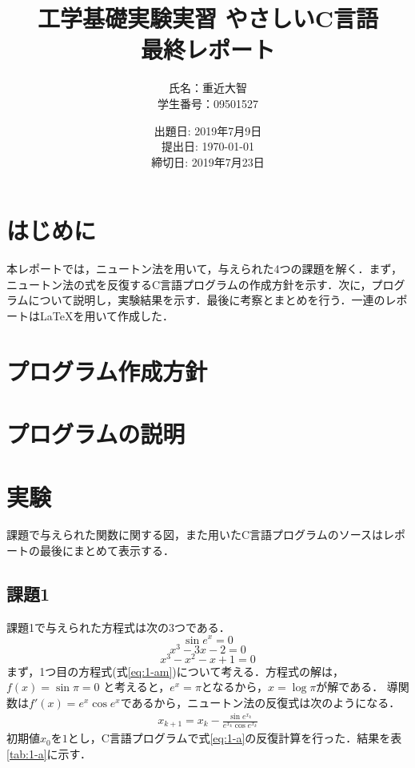 \documentclass[12pt]{jarticle}
\renewcommand  \[  {\begin{eqnarray}}
\renewcommand  \]  {\end{eqnarray}}
\begin{document}
\title{工学基礎実験実習 やさしいC言語\\最終レポート}%
\date{出題日: 2019年7月9日 \\
      提出日: \today \\
      締切日: 2019年7月23日 \\} 
\author{氏名：重近大智\\学生番号：09501527}
\maketitle

\section{はじめに}
本レポートでは，ニュートン法を用いて，与えられた4つの課題を解く．まず，ニュートン法の式を反復するC言語プログラムの作成方針を示す．次に，プログラムについて説明し，実験結果を示す．最後に考察とまとめを行う．一連のレポートは\LaTeX{}を用いて作成した．

\section{プログラム作成方針}


\section{プログラムの説明}

\section{実験}
\label{sec:exp}
課題で与えられた関数に関する図，また用いたC言語プログラムのソースはレポートの最後にまとめて表示する．
\subsection{課題1}
課題1で与えられた方程式は次の3つである．
\begin{equation}
\sin e^x = 0
\label{eq:1-am}
\end{equation}
\begin{equation}
x^3-3x-2 = 0
\label{eq:1-bm}
\end{equation}
\begin{equation}
x^3-x^2-x+1 = 0
\label{eq:1-cm}
\end{equation}
まず，1つ目の方程式(式\ref{eq:1-am})について考える．方程式の解は，$f(x)=\sin\pi=0$
と考えると，$e^x=\pi$となるから，$x=\log\pi$が解である．
導関数は$f\prime(x)=e^x\cos e^x$であるから，ニュートン法の反復式は次のようになる．
\[
\label{eq:1-a}
x_{k+1}=x_k- \frac{\sin e^{x_k}}{e^{x_k}\cos e^{x_k}}
\]
初期値$x_0$を$1$とし，C言語プログラムで式\ref{eq:1-a}の反復計算を行った．結果を表\ref{tab:1-a}に示す．
\end{document}
